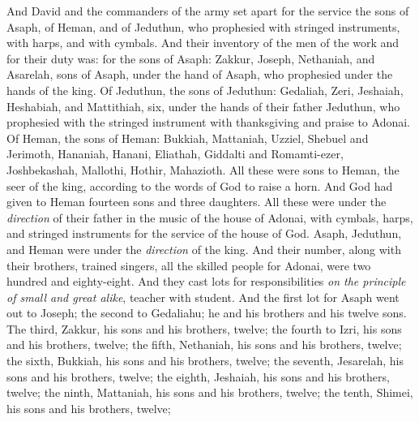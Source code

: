 \begin{biblechapter} %
 And David and the commanders of the army set apart for the service the sons of Asaph, of Heman, and of Jeduthun, who prophesied with stringed instruments, with harps, and with cymbals. And their inventory of the men of the work and for their duty was:
\verse for the sons of Asaph: Zakkur, Joseph, Nethaniah, and Asarelah, sons of Asaph, under the hand of Asaph, who prophesied under the hands of the king.
\verse Of Jeduthun, the sons of Jeduthun: Gedaliah, Zeri, Jeshaiah, Heshabiah, and Mattithiah, six, under the hands of their father Jeduthun, who prophesied with the stringed instrument with thanksgiving and praise to Adonai.
\verse Of Heman, the sons of Heman: Bukkiah, Mattaniah, Uzziel, Shebuel and Jerimoth, Hananiah, Hanani, Eliathah, Giddalti and Romamti-ezer, Joshbekashah, Mallothi, Hothir, Mahazioth.
\verse All these were sons to Heman, the seer of the king, according to the words of God to raise a horn. And God had given to Heman fourteen sons and three daughters.
\verse All these were under the \textit{direction} of their father in the music of the house of Adonai, with cymbals, harps, and stringed instruments for the service of the house of God. Asaph, Jeduthun, and Heman were under the \textit{direction} of the king.
\verse And their number, along with their brothers, trained singers, all the skilled people for Adonai, were two hundred and eighty-eight.
\verse And they cast lots for responsibilities \textit{on the principle of small and great alike}, teacher with student.
\verse And the first lot for Asaph went out to Joseph; the second to Gedaliahu; he and his brothers and his twelve sons.
\verse The third, Zakkur, his sons and his brothers, twelve;
\verse the fourth to Izri, his sons and his brothers, twelve;
\verse the fifth, Nethaniah, his sons and his brothers, twelve;
\verse the sixth, Bukkiah, his sons and his brothers, twelve;
\verse the seventh, Jesarelah, his sons and his brothers, twelve;
\verse the eighth, Jeshaiah, his sons and his brothers, twelve;
\verse the ninth, Mattaniah, his sons and his brothers, twelve;
\verse the tenth, Shimei, his sons and his brothers, twelve;

\end{biblechapter}
